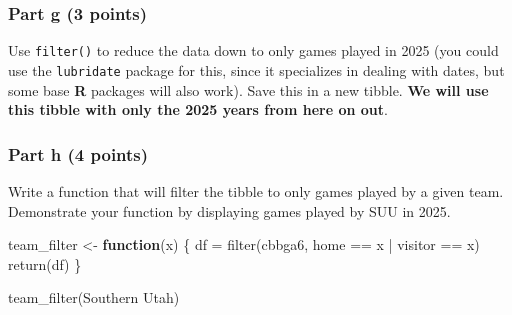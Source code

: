\documentclass[
  letterpaper,
  DIV=11,
  numbers=noendperiod]{scrartcl}
\newenvironment{Shaded}{\begin{snugshade}}{\end{snugshade}}
\newcommand{\AttributeTok}[1]{\textcolor[rgb]{0.40,0.45,0.13}{#1}}
\newcommand{\ControlFlowTok}[1]{\textcolor[rgb]{0.00,0.23,0.31}{\textbf{#1}}}
\newcommand{\FunctionTok}[1]{\textcolor[rgb]{0.28,0.35,0.67}{#1}}
\newcommand{\NormalTok}[1]{\textcolor[rgb]{0.00,0.23,0.31}{#1}}
\newcommand{\OtherTok}[1]{\textcolor[rgb]{0.00,0.23,0.31}{#1}}
\newcommand{\SpecialCharTok}[1]{\textcolor[rgb]{0.37,0.37,0.37}{#1}}
\newcommand{\StringTok}[1]{\textcolor[rgb]{0.13,0.47,0.30}{#1}}
\begin{document}
\subsubsection{Part g (3 points)}\label{part-g-3-points}

Use \texttt{filter()} to reduce the data down to only games played in
2025 (you could use the \texttt{lubridate} package for this, since it
specializes in dealing with dates, but some base \textbf{R} packages
will also work). Save this in a new tibble. \textbf{We will use this
tibble with only the 2025 years from here on out}.

\begin{Shaded}
\end{Shaded}

\subsubsection{Part h (4 points)}\label{part-h-4-points}

Write a function that will filter the tibble to only games played by a
given team. Demonstrate your function by displaying games played by SUU
in 2025.

\begin{Shaded}
\begin{Highlighting}[]
\NormalTok{team\_filter }\OtherTok{\textless{}{-}} \ControlFlowTok{function}\NormalTok{(x) \{}
\NormalTok{  df }\OtherTok{=} \FunctionTok{filter}\NormalTok{(cbbga6, home }\SpecialCharTok{==}\NormalTok{ x }\SpecialCharTok{|}\NormalTok{ visitor }\SpecialCharTok{==}\NormalTok{ x)}
  \FunctionTok{return}\NormalTok{(df)}
\NormalTok{\}}

\FunctionTok{team\_filter}\NormalTok{(}\StringTok{\textquotesingle{}Southern Utah\textquotesingle{}}\NormalTok{)}
\end{Highlighting}
\end{Shaded}
\end{document}

